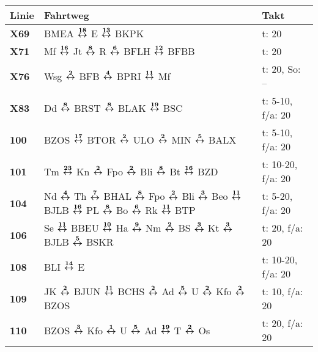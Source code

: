\begin{minipage}[t]{0.45\textwidth}
\begin{tabular}{>{\bfseries}L{1.2cm}L{9.0cm}L{3.0cm}}
{\bfseries Linie} & {\bfseries Fahrtweg} & {\bfseries Takt} \\
\hline
\xbus{} X69   & BMEA $\xarwe{18}$ E $\xarwe{13}$ BKPK
& t: 20                      \\
\xbus{} X71   & Mf $\xarwe{16}$ Jt $\xarwe{8}$ R $\xarwe{6}$ BFLH $\xarwe{12}$ BFBB                               & t: 20                  \\
\xbus{} X76   & Wsg $\xarwe{2}$ BFB $\xarwe{4}$ BPRI $\xarwe{11}$ Mf                                                                                                                & t: 20, So: --              \\
\xbus{} X83   & Dd $\xarwe{8}$ BRST $\xarwe{8}$ BLAK $\xarwe{19}$ BSC                                                                                                               & t: 5-10, f/a: 20           \\
\bus{} 100    & BZOS $\xarwe{17}$ BTOR $\xarwe{2}$ ULO $\xarwe{2}$ MIN $\xarwe{5}$ BALX                                                                                             & t: 5-10, f/a: 20           \\
\bus{} 101    & Tm $\xarwe{23}$ Kn $\xarwe{2}$ Fpo $\xarwe{2}$ Bli $\xarwe{8}$ Bt $\xarwe{16}$ BZD                                                                                  & t: 10-20, f/a: 20          \\
\bus{} 104    & Nd $\xarwe{4}$ Th $\xarwe{7}$ BHAL $\xarwe{8}$ Fpo $\xarwe{2}$ Bli $\xarwe{3}$ Beo $\xarwe{11}$ BJLB $\xarwe{16}$ PL $\xarwe{8}$ Bo $\xarwe{6}$ Rk $\xarwe{11}$ BTP & t: 5-20, f/a: 20           \\
\bus{} 106    & Se $\xarwe{11}$ BBEU $\xarwe{10}$ Ha $\xarwe{9}$ Nm $\xarwe{2}$ BS $\xarwe{3}$ Kt $\xarwe{3}$ BJLB $\xarwe{5}$ BSKR                                                 & t: 20, f/a: 20             \\
\bus{} 108    & BLI $\xarwe{14}$ E                                                                                                                                                  & t: 10-20, f/a: 20          \\
\bus{} 109    & JK $\xarwe{2}$ BJUN $\xarwe{11}$ BCHS $\xarwe{2}$ Ad $\xarwe{5}$ U $\xarwe{2}$ Kfo $\xarwe{2}$ BZOS                                                 & t: 10, f/a: 20             \\
\bus{} 110    & BZOS $\xarwe{3}$ Kfo $\xarwe{1}$ U $\xarwe{5}$ Ad $\xarwe{19}$ T $\xarwe{2}$ Os                                                                                     & t: 20, f/a: 20             \\

\end{tabular}
\end{minipage}
